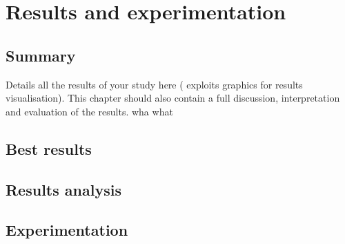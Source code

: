 
\chapter{Results and experimentation}
\label{chap:results}
\ifpdf
    \graphicspath{{Algorithms/Figures/PNG/}{EvaluationTask/Figures/PDF/}{Algorithms/Figures/}}
\else
    \graphicspath{{Algorithms/Figures/EPS/}{EvaluationTask/Figures/}}
\fi


\section*{Summary}
Details all the results of your study here ( exploits graphics for results
visualisation). This chapter should also contain a full discussion,
interpretation and evaluation of the results. 
wha what


\section{Best results} 
\label{sec:bestresults}
\section{Results analysis} 
\label{sec:resultsanalysis}
\section{Experimentation} 
\label{sec:experimentation}

